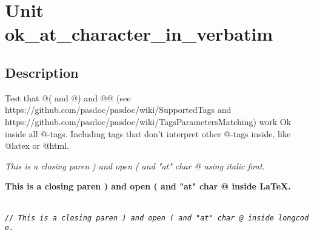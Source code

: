 \documentclass{report}
\begin{document}
\newlength{\tmplength}
\chapter{Unit ok{\_}at{\_}character{\_}in{\_}verbatim}
\section{Description}
Test that @( and @) and @@ (see https://github.com/pasdoc/pasdoc/wiki/SupportedTags and https://github.com/pasdoc/pasdoc/wiki/TagsParametersMatching) work Ok inside all @{-}tags. Including tags that don't interpret other @{-}tags inside, like @latex or @html.

\textit{This is a closing paren ) and open ( and "at" char @ using italic font.}

{\bf This is a closing paren ) and open ( and "at" char @ inside LaTeX.}



\texttt{\\\nopagebreak[3]
\textit{//~This~is~a~closing~paren~)~and~open~(~and~"at"~char~@~inside~longcode.}\\
}
\end{document}
